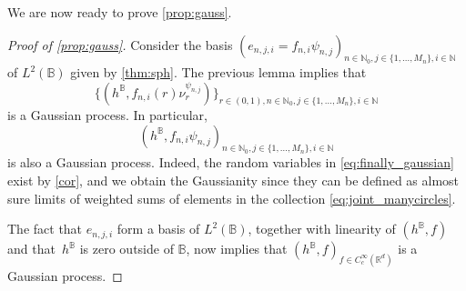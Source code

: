 \documentclass[10pt]{amsart}
\theoremstyle{definition}
\newcommand{\R}{\mathbb{R}}
\newcommand{\N}{\mathbb{N}}
\newcommand{\B}{\mathbb{B}}\let\D\B\let\Ub\B
\begin{document}
{We are now ready to prove \cref{prop:gauss}.}

\begin{proof}[Proof of \cref{prop:gauss}]

Consider the basis {$(e_{n,j,i} = f_{n,i}\psi_{n,j})_{n \in \N_0, j \in \{1, \dots, M_n\},i \in \N}$} of $L^2(\B)$ given by \cref{thm:sph}. The previous lemma implies that\vspace*{-3pt}
\begin{equation}\label{eq:joint_manycircles}
\{(h^\B, f_{n,i}(r)\nu_r^{\psi_{n,j}})\}_{r \in (0,1), n \in \N_0, j \in \{1, \dots, M_n\}, i \in \N}
\end{equation}
is a Gaussian process. In particular,\vspace*{-3pt}
\begin{equation}\label{eq:finally_gaussian}
{(h^\B,f_{n,i}\psi_{n,j})_{n \in \N_0, j \in \{1, \dots, M_n\}, i \in \N}}
\end{equation}
is also a Gaussian process. Indeed, the random variables in \eqref{eq:finally_gaussian} exist by \cref{cor}, and we obtain the Gaussianity since they can be defined as almost sure limits of weighted sums of elements in the collection \eqref{eq:joint_manycircles}.

The fact that $e_{n,j,i}$ form a basis of $L^2(\B)$, together with linearity of $(h^\B, f)$ and that~$h^\B$ is zero outside of $\B$, now implies that $(h^\B,f)_{f \in C_c^\infty(\R^d)}$ is a Gaussian process.
\end{proof}
\end{document}
